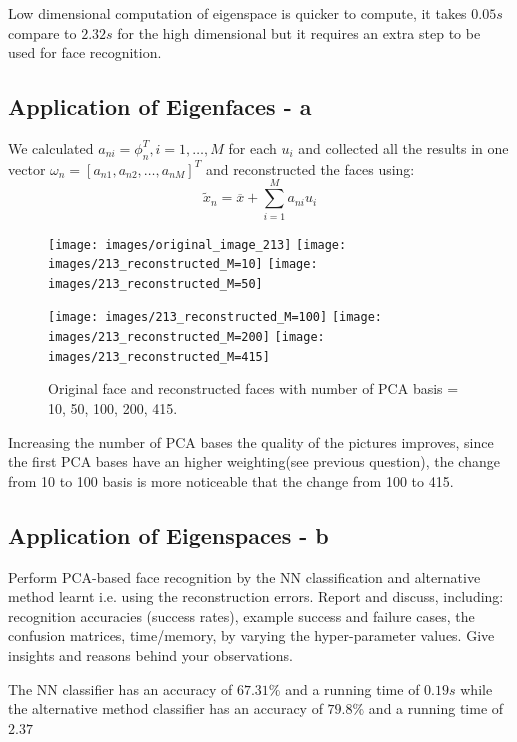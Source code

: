 \documentclass[10pt,twocolumn,letterpaper]{article}
\begin{document}
Low dimensional computation of eigenspace is quicker to compute, it takes $0.05s$ compare to $2.32s$ for the high dimensional but it requires an extra step to be used for face recognition.


\subsection{Application of Eigenfaces - a}
We calculated $a_{ni} = \phi^T_n , i=1,\ldots,M$ for each $u_i$ and collected all the results in one vector $\omega_n = [a_{n1}, a_{n2},\ldots,a_{nM}]^T$ and reconstructed the faces using:
\begin{equation}
    \widetilde{x}_n = \overline{x} + \sum^M_{i=1}a_{ni}u_i
\end{equation}

\begin{figure}[h]
    \centering
    \texttt{[image: images/original\_image\_213]} 
    \texttt{[image: images/213\_reconstructed\_M=10]}
    \texttt{[image: images/213\_reconstructed\_M=50]}
    
    \texttt{[image: images/213\_reconstructed\_M=100]}
    \texttt{[image: images/213\_reconstructed\_M=200]}
    \texttt{[image: images/213\_reconstructed\_M=415]}
    \caption{Original face and reconstructed faces with number of PCA basis = 10, 50, 100, 200, 415.}
    \label{fig:reconstructed faces}
\end{figure}
Increasing the number of PCA bases the quality of the pictures improves, since the first PCA bases have an higher weighting(see previous question), the change from 10 to 100 basis is more noticeable that the change from 100 to 415.

\subsection{Application of Eigenspaces - b}
Perform PCA-based face recognition by the NN classification and alternative method learnt i.e. using the reconstruction errors. Report and discuss, including: recognition accuracies (success rates), example success and failure cases, the confusion matrices,
time/memory, by varying the hyper-parameter values. Give insights and reasons behind your observations. 

The NN classifier has an accuracy of $67.31\%$ and a running time of $0.19s$ while the alternative method classifier has an accuracy of $79.8\%$ and a running time of $2.37$
\end{document}
